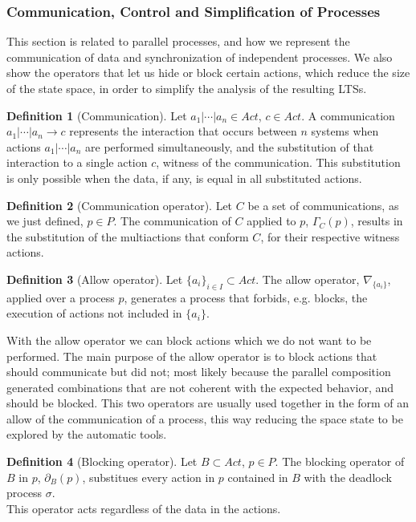 \documentclass[11pt]{article}
\theoremstyle{definition}
\newtheorem{definition}{Definition}
\theoremstyle{plain}
\begin{document}
\subsubsection{Communication, Control and Simplification of Processes}
This section is related to parallel processes, and how we represent the communication of data and synchronization of independent processes. We also show the operators that let us hide or block certain actions, which reduce the size of the state space, in order to simplify the analysis of the resulting LTSs.
\begin{definition} [Communication]
	Let $ a_1 \vert \cdots \vert a_n \in Act$, $ c \in Act$. A communication $ a_1 \vert \cdots \vert a_n\rightarrow c  $ represents the interaction that occurs between $ n $ systems when actions $ a_1 \vert \cdots \vert a_n $ are performed simultaneously, and the substitution of that interaction to a single action $ c $, witness of the communication. This substitution is only possible when the data, if any, is equal in all substituted actions.
\end{definition}
\begin{definition} [Communication operator]
	Let $ C $ be a set of communications, as we just defined, $ p \in P $. The communication of $ C $ applied to $ p $, $ \Gamma_{C}(p) $, results in the substitution of the multiactions that conform $ C $, for their respective witness actions.
\end{definition}

\begin{definition}[Allow operator]
	Let $ \big\{a_i\big\}_{i \in I} \subset Act$. The allow operator, $ \nabla_{\big\{a_i\big\}} $, applied over a process $ p $, generates a process that forbids, e.g. blocks, the execution of actions not included in $ \big\{a_i\big\} $.
\end{definition}
With the allow operator we can block actions which we do not want to be performed. The main purpose of the allow operator is to block actions that should communicate but did not; most likely because the parallel composition generated combinations that are not coherent with the expected behavior, and should be blocked.
This two operators are usually used together in the form of an allow of the communication of a process, this way reducing the space state to be explored by the automatic tools.
\begin{definition}[Blocking operator]
	Let $ B \subset Act $, $ p \in P $. The blocking operator of $ B $ in $ p $, $ \partial_B(p) $, substitues every action in $ p $ contained in $ B $ with the deadlock process $ \sigma $. \\
	This operator acts regardless of the data in the actions.
\end{definition}
\end{document}
